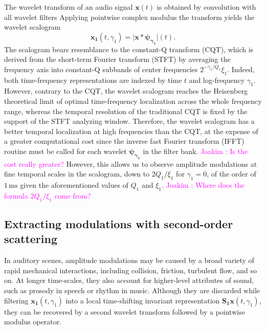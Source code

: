 \documentclass[journal]{IEEEtran}
\newcommand{\ja}[1]{\textcolor{magenta}{Joakim : #1}}
\begin{document}
The wavelet transform of an audio signal
$\boldsymbol{x}(t)$ is obtained by convolution with all wavelet filters
Applying pointwise complex modulus the transform yields
the wavelet scalogram
\begin{equation}
\boldsymbol{x_1}(t, \gamma_1)
= \vert \boldsymbol{x} \ast \boldsymbol{\psi_{\gamma_1}} \vert (t)\mbox{.}
\end{equation}
The scalogram bears resemblance to the constant-Q transform (CQT),
which is derived from the short-term Fourier transform (STFT) by averaging the frequency
axis into constant-Q subbands of center frequencies $2^{-\gamma_1/Q_1}\xi_1$.
Indeed, both time-frequency representations are indexed by time $t$ and log-frequency $\gamma_1$.
However, contrary to the CQT, the wavelet scalogram reaches the Heisenberg
theoretical limit of optimal time-frequency localization across the whole
frequency range, whereas the temporal resolution of the traditional CQT is fixed by the support of the STFT analyzing window. %
Therefore, the wavelet scalogram has a better temporal localization at high
frequencies than the CQT, at the expense of a greater computational cost
since the inverse fast Fourier transform (IFFT) routine must be called for each wavelet $\boldsymbol{\psi_{\gamma_1}}$ in the filter bank. \ja{Is the cost really greater?}
However, this allows us to observe amplitude modulations at fine temporal scales in the scalogram, down to $2Q_1/\xi_1$ for $\gamma_1 = 0$, of the order of $1\,\textrm{ms}$ given the aforementioned values of $Q_1$ and $\xi_1$. \ja{Where does the formula $2Q_1/\xi_1$ come from?}

\subsection{Extracting modulations with second-order scattering}
In auditory scenes, amplitude modulations may be caused by a broad variety of rapid mechanical interactions, including collision, friction, turbulent flow, and so on.
At longer time-scales, they also account for higher-level attributes of sound, such as prosody in speech or rhythm in music.
Although they are discarded while filtering $\boldsymbol{x_1}(t,\gamma_1)$ into a local time-shifting invariant representation $\mathbf{S_1}\boldsymbol{x}(t,\gamma_1)$, they can be recovered by a second wavelet transform followed by a pointwise modulus operator.
\end{document}
